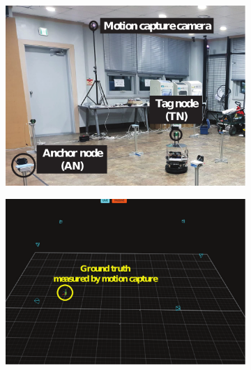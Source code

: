 \documentclass[letterpaper, 10 pt, conference]{ieeeconf}
\begin{document}
\begin{figure}[h]
	\centering
	\begin{subfigure}[b]{0.32\textwidth}
		\includegraphics[width=\textwidth]{image/system_whole_picture}
		\caption{}
		\label{fig:whole_system}
	\end{subfigure}
	\begin{subfigure}[b]{0.32\textwidth}
		\includegraphics[width=\textwidth]{image/motion_capture}
		\caption{}
		\label{fig:Optitrack_figure}
	\end{subfigure}

\end{figure}
\end{document}
